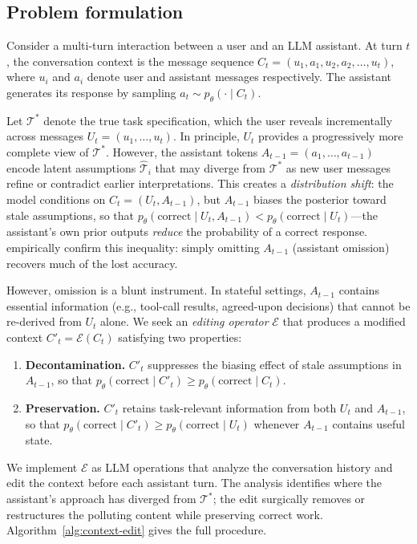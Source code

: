 \documentclass{article} %
\begin{document}
\subsection{Problem formulation}
\label{sec:problem-setting}

Consider a multi-turn interaction between a user and an LLM assistant. At turn $t$, the conversation context is the message sequence $C_t = (u_1, a_1, u_2, a_2, \ldots, u_t)$, where $u_i$ and $a_i$ denote user and assistant messages respectively. The assistant generates its response by sampling $a_t \sim p_\theta(\cdot \mid C_t)$.

Let $\mathcal{T}^*$ denote the true task specification, which the user reveals incrementally across messages $U_t = (u_1, \ldots, u_t)$.  In principle, $U_t$ provides a progressively more complete view of $\mathcal{T}^*$.  However, the assistant tokens $A_{t-1} = (a_1, \ldots, a_{t-1})$ encode latent assumptions $\hat{\mathcal{T}}_i$ that may diverge from $\mathcal{T}^*$ as new user messages refine or contradict earlier interpretations.  This creates a \emph{distribution shift}: the model conditions on $C_t = (U_t, A_{t-1})$, but $A_{t-1}$ biases the posterior toward stale assumptions, so that $p_\theta(\text{correct} \mid U_t, A_{t-1}) < p_\theta(\text{correct} \mid U_t)$---the assistant's own prior outputs \emph{reduce} the probability of a correct response. \citet{huang2026context} empirically confirm this inequality: simply omitting $A_{t-1}$ (assistant omission) recovers much of the lost accuracy.

However, omission is a blunt instrument. In stateful settings, $A_{t-1}$ contains essential information (e.g., tool-call results, agreed-upon decisions) that cannot be re-derived from $U_t$ alone. We seek an \emph{editing operator} $\mathcal{E}$ that produces a modified context $C'_t = \mathcal{E}(C_t)$ satisfying two properties:
\begin{enumerate}
    \item \textbf{Decontamination.} $C'_t$ suppresses the biasing effect of stale assumptions in $A_{t-1}$, so that $p_\theta(\text{correct} \mid C'_t) \geq p_\theta(\text{correct} \mid C_t)$.
    \item \textbf{Preservation.} $C'_t$ retains task-relevant information from both $U_t$ and $A_{t-1}$, so that $p_\theta(\text{correct} \mid C'_t) \geq p_\theta(\text{correct} \mid U_t)$ whenever $A_{t-1}$ contains useful state.
\end{enumerate}

We implement $\mathcal{E}$ as LLM operations that analyze the conversation history and edit the context before each assistant turn. The analysis identifies where the assistant's approach has diverged from $\mathcal{T}^*$; the edit surgically removes or restructures the polluting content while preserving correct work. Algorithm~\ref{alg:context-edit} gives the full procedure.
\end{document}
